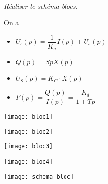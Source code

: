 \subparagraph{}
\textit{Réaliser le schéma-blocs.}
\ifprof
\begin{corrige}
On a :
\begin{itemize}
\item $U_c(p)=\dfrac{1}{K_a}I(p)+U_s(p)$
\item $Q(p)=SpX(p)$
\item $U_S(p)=K_C\cdot X(p)$
\item $F(p)=\dfrac{Q(p)}{I(p)}=\dfrac{K_d}{1+Tp}$
\end{itemize}


\begin{minipage}[c]{.23\linewidth}
\begin{center}
\texttt{[image: bloc1]}
\end{center}
\end{minipage}\hfill
\begin{minipage}[c]{.23\linewidth}
\begin{center}
\texttt{[image: bloc2]}
\end{center}
\end{minipage}\hfill
\begin{minipage}[c]{.23\linewidth}
\begin{center}
\texttt{[image: bloc3]}
\end{center}
\end{minipage}\hfill
\begin{minipage}[c]{.23\linewidth}
\begin{center}
\texttt{[image: bloc4]}
\end{center}
\end{minipage}



\begin{center}
\texttt{[image: schema\_bloc]}
\end{center}
\end{corrige}
\else 
\fi
